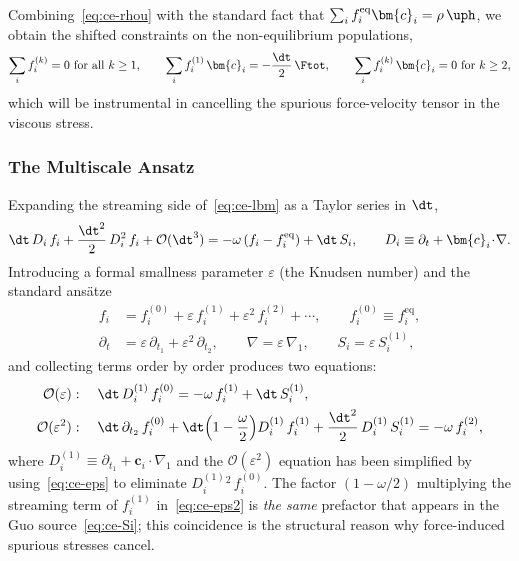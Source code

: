 Combining~\eqref{eq:ce-rhou} with the standard fact that $\sum_i f_i^{\mathrm{eq}}\bm{c}_i = \rho\,\uph$, we obtain the shifted constraints on the non-equilibrium populations,
\begin{equation}
\sum_i f_i^{(k)} = 0\ \text{for all $k \geq 1$},\qquad \sum_i f_i^{(1)}\,\bm{c}_i = -\frac{\dt}{2}\,\Ftot,\qquad \sum_i f_i^{(k)}\,\bm{c}_i = 0\ \text{for $k \geq 2$},
\label{eq:ce-fkmom}
\end{equation}
which will be instrumental in cancelling the spurious force-velocity tensor in the viscous stress.

\subsubsection{The Multiscale Ansatz}\label{sec:ce-multiscale}

Expanding the streaming side of~\eqref{eq:ce-lbm} as a Taylor series in $\dt$,
\begin{equation}
\dt\,D_i\,f_i + \frac{\dt^{2}}{2}\,D_i^{2}\,f_i + \mathcal{O}(\dt^{3}) = -\omega\,(f_i - f_i^{\mathrm{eq}}) + \dt\,S_i,\qquad D_i \equiv \partial_t + \bm{c}_i\!\cdot\!\nabla.
\label{eq:ce-taylor}
\end{equation}
Introducing a formal smallness parameter $\varepsilon$ (the Knudsen number) and the standard ans\"atze
\begin{align}
f_i &= f_i^{(0)} + \varepsilon\,f_i^{(1)} + \varepsilon^{2}\,f_i^{(2)} + \cdots,\qquad f_i^{(0)} \equiv f_i^{\mathrm{eq}},\\
\partial_t &= \varepsilon\,\partial_{t_1} + \varepsilon^{2}\,\partial_{t_2},\qquad \nabla = \varepsilon\,\nabla_1,\qquad S_i = \varepsilon\,S_i^{(1)},
\end{align}
and collecting terms order by order produces two equations:
\begin{align}
\mathcal{O}(\varepsilon)&:\quad \dt\,D_i^{(1)}\,f_i^{(0)} = -\omega\,f_i^{(1)} + \dt\,S_i^{(1)},\label{eq:ce-eps}\\
\mathcal{O}(\varepsilon^{2})&:\quad \dt\,\partial_{t_2}\,f_i^{(0)} + \dt\!\left(1 - \frac{\omega}{2}\right)\!D_i^{(1)}\,f_i^{(1)} + \frac{\dt^{2}}{2}\,D_i^{(1)}\,S_i^{(1)} = -\omega\,f_i^{(2)},\label{eq:ce-eps2}
\end{align}
where $D_i^{(1)} \equiv \partial_{t_1} + \bm{c}_i\!\cdot\!\nabla_1$ and the $\mathcal{O}(\varepsilon^{2})$ equation has been simplified by using~\eqref{eq:ce-eps} to eliminate $D_i^{(1)}{}^{2}\,f_i^{(0)}$.
The factor $(1-\omega/2)$ multiplying the streaming term of $f_i^{(1)}$ in~\eqref{eq:ce-eps2} is \emph{the same} prefactor that appears in the Guo source~\eqref{eq:ce-Si};
this coincidence is the structural reason why force-induced spurious stresses cancel.

